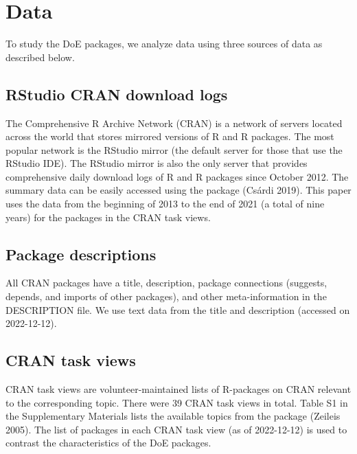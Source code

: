 \hypertarget{data}{%
\section{Data}\label{data}}

To study the DoE packages, we analyze data using three sources of data as described below.

\hypertarget{rstudio-cran-download-logs}{%
\subsection{RStudio CRAN download logs}\label{rstudio-cran-download-logs}}

The Comprehensive R Archive Network (CRAN) is a network of servers located across the world that stores mirrored versions of R and R packages. The most popular network is the RStudio mirror (the default server for those that use the RStudio IDE). The RStudio mirror is also the only server that provides comprehensive daily download logs of R and R packages since October 2012. The summary data can be easily accessed using the  package (Csárdi 2019). This paper uses the data from the beginning of 2013 to the end of 2021 (a total of nine years) for the packages in the CRAN task views.

\hypertarget{package-descriptions}{%
\subsection{Package descriptions}\label{package-descriptions}}

All CRAN packages have a title, description, package connections (suggests, depends, and imports of other packages), and other meta-information in the DESCRIPTION file. We use text data from the title and description (accessed on 2022-12-12).

\hypertarget{cran-task-views}{%
\subsection{CRAN task views}\label{cran-task-views}}

CRAN task views are volunteer-maintained lists of R-packages on CRAN relevant to the corresponding topic. There were 39 CRAN task views in total. Table S1 in the Supplementary Materials lists the available topics from the  package (Zeileis 2005).
The list of packages in each CRAN task view (as of 2022-12-12) is used to contrast the characteristics of the DoE packages.

